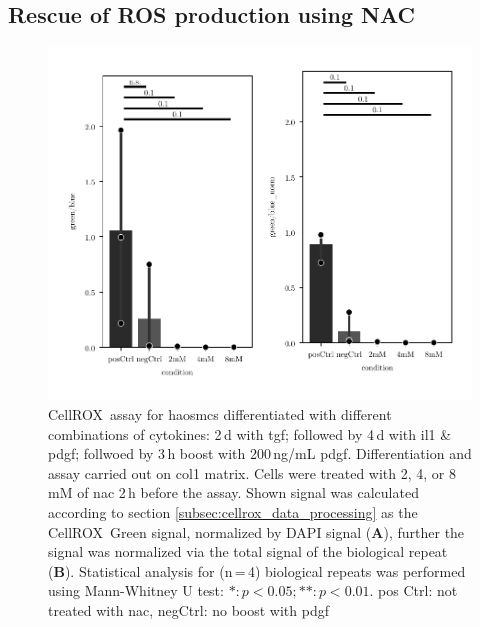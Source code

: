     \subsection{Rescue of ROS production using NAC}
        \begin{figure}[h!]
    \capstart
        \centering
    	\includegraphics{Abbildung/NAC_quench.pdf}

    	\begin{minipage}{\captionwidth}
    		\caption[NAC quench]{ \newline
            CellROX\texttrademark~assay for \acp{haosmc} differentiated with different combinations of cytokines: 2\,d with \ac{tgf}; followed by 4\,d with \ac{il1} \& \ac{pdgf}; follwoed by 3\,h boost with 200\,ng/mL \ac{pdgf}. Differentiation and assay carried out on \ac{col1} matrix. Cells were treated with 2, 4, or 8\,mM of \ac{nac} 2\,h before the assay.
            Shown signal was calculated according to section \ref{subsec:cellrox_data_processing} as the CellROX\texttrademark~Green signal, normalized by DAPI signal (\textbf{A}), further the signal was normalized via the total signal of the biological repeat (\textbf{B}). Statistical analysis for (n\,=\,4) biological repeats was performed using Mann-Whitney U test: $*: p < 0.05; **: p < 0.01$.
            pos Ctrl: not treated with \ac{nac}, negCtrl: no boost with \ac{pdgf}}
    		\label{fig:NAC_quench}
    	\end{minipage}
    \end{figure}

